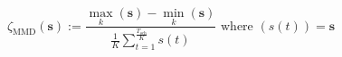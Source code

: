 \begin{equation}
	\zeta_\text{MMD}(\textbf{s}) := \frac{\max_k \left(\textbf{s}\right) - \min_k\left(\textbf{s}\right)}{\frac{1}{K}\sum_{t=1}^{\frac{T_\text{sch}}{K}}s(t)}
	\text{ where } (s(t)) = \textbf{s}
\label{ch1:equ:min-max-difference-definition}
\end{equation}